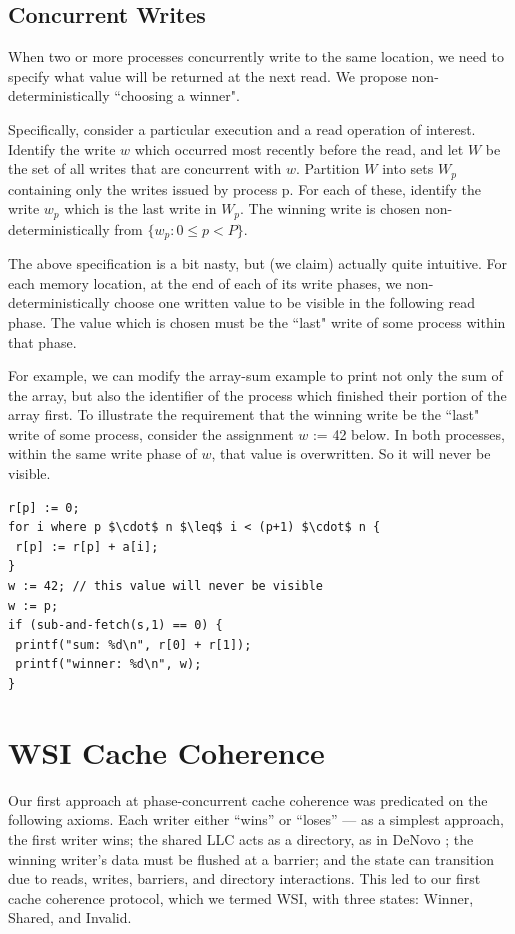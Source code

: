 \documentclass{article}
\begin{document}
\subsection{Concurrent Writes}
When two or more processes concurrently write to the same location, we need to specify what value will be returned at the next read. We propose non-deterministically ``choosing a winner".

Specifically, consider a particular execution and a read operation of interest. Identify the write $w$ which occurred most recently before the read, and let $W$ be the set of all writes that are concurrent with $w$. Partition $W$ into sets $W_p$ containing only the writes issued by process p. For each of these, identify the write $w_p$ which is the last write in $W_p$. The winning write is chosen non-deterministically from $\{w_p : 0 \leq p < P\}$.

The above specification is a bit nasty, but (we claim) actually quite intuitive. For each memory location, at the end of each of its write phases, we non-deterministically choose one written value to be visible in the following read phase. The value which is chosen must be the ``last" write of some process within that phase.

For example, we can modify the array-sum example to print not only the sum of the array, but also the identifier of the process which finished their portion of the array first. To illustrate the requirement that the winning write be the ``last" write of some process, consider the assignment $w$ := 42 below. In both processes, within the same write phase of $w$, that value is overwritten. So it will never be visible.

\begin{lstlisting}
r[p] := 0;
for i where p $\cdot$ n $\leq$ i < (p+1) $\cdot$ n {
 r[p] := r[p] + a[i];
}
w := 42; // this value will never be visible
w := p;
if (sub-and-fetch(s,1) == 0) {
 printf("sum: %d\n", r[0] + r[1]);
 printf("winner: %d\n", w);
}
\end{lstlisting}


\section{WSI Cache Coherence}
Our first approach at phase-concurrent cache coherence was predicated on the following axioms. Each writer either ``wins'' or ``loses'' --- as a simplest approach, the first writer wins; the shared LLC acts as a directory, as in DeNovo \cite{choi2010denovo}; the winning writer's data must be flushed at a barrier; and the state can transition due to reads, writes, barriers, and directory interactions. This led to our first cache coherence protocol, which we termed WSI, with three states: Winner, Shared, and Invalid.
\end{document}
